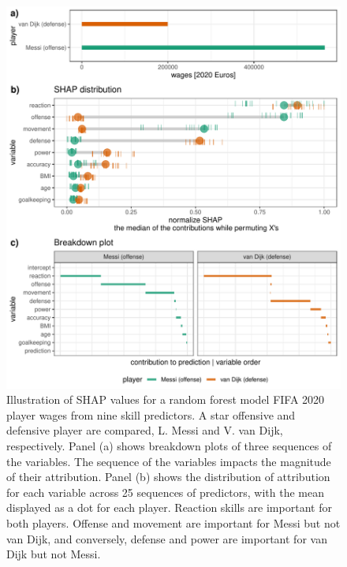 \documentclass[
]{sn-jnl}
\begin{document}
\begin{CodeChunk}
\begin{figure}

{\centering \includegraphics[width=0.85\linewidth]{./figures/shap_distr_bd} 

}

\caption[Illustration of SHAP values for a random forest model FIFA 2020 player wages from nine skill predictors]{Illustration of SHAP values for a random forest model FIFA 2020 player wages from nine skill predictors. A star offensive and defensive player are compared, L. Messi and V. van Dijk, respectively. Panel (a) shows breakdown plots of three sequences of the variables. The sequence of the variables impacts the magnitude of their attribution. Panel (b) shows the distribution of attribution for each variable across 25 sequences of predictors, with the mean displayed as a dot for each player. Reaction skills are important for both players. Offense and movement are important for Messi but not van Dijk, and conversely, defense and power are important for van Dijk but not Messi.}\label{fig:shapdistrbd}
\end{figure}
\end{CodeChunk}
\end{document}
